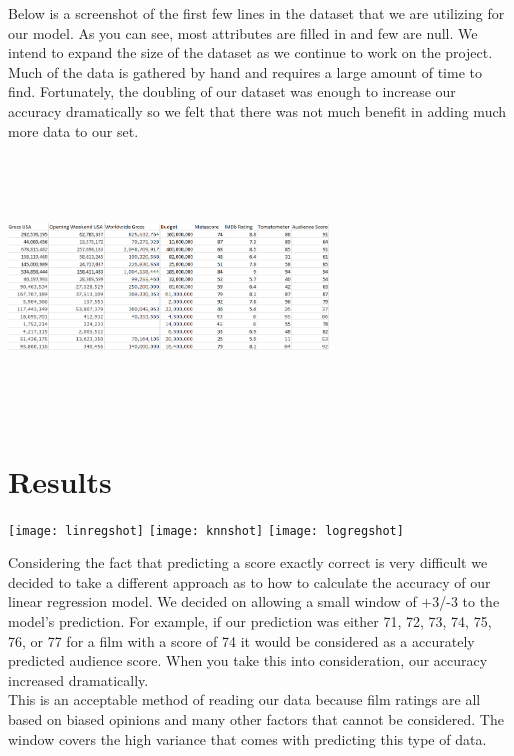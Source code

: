 \documentclass[10pt,twocolumn,letterpaper]{article}
\begin{document}
	Below is a screenshot of the first few lines in the dataset that we are utilizing for our
	model. As you can see, most attributes are filled in and few are null. We intend to expand
	the size of the dataset as we continue to work on the project. Much of the data is gathered
	by hand and requires a large amount of time to find. Fortunately, the doubling of our dataset was enough to increase our accuracy dramatically so we felt that there was not much benefit in adding much more data to our set.
	
	\begin{center}
		\includegraphics[width=8.5cm,height=6.95cm]{moviedatashot}
	\end{center}

\section{Results}
	\begin{center}
		\texttt{[image: linregshot]}
		\texttt{[image: knnshot]}
		\texttt{[image: logregshot]}
	\end{center}
	
	Considering the fact that predicting a score exactly correct is very difficult we decided to take
	a different approach as to how to calculate the accuracy of our linear regression model. We decided on
	allowing a small window of +3/-3 to the model's prediction. For example, if our prediction was either 71,
	72, 73, 74, 75, 76, or 77 for a film with a score of 74 it would be considered as a accurately predicted
	audience score. When you take this into consideration, our accuracy increased dramatically.\\
	This is an acceptable method of reading our data because film ratings are all based on biased opinions
	and many other factors that cannot be considered. The window covers the high variance that comes with
	predicting this type of data.
\end{document}
